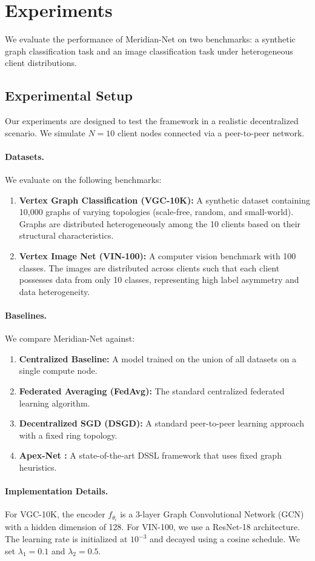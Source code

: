 \section{Experiments}
We evaluate the performance of Meridian-Net on two benchmarks: a synthetic graph classification task and an image classification task under heterogeneous client distributions.

\subsection{Experimental Setup}
Our experiments are designed to test the framework in a realistic decentralized scenario. We simulate $N=10$ client nodes connected via a peer-to-peer network.

\paragraph{Datasets.}
We evaluate on the following benchmarks:
\begin{enumerate}[label=\lbrack\arabic*\rbrack]
  \item \textbf{Vertex Graph Classification (VGC-10K):} A synthetic dataset containing 10,000 graphs of varying topologies (scale-free, random, and small-world). Graphs are distributed heterogeneously among the 10 clients based on their structural characteristics.
  \item \textbf{Vertex Image Net (VIN-100):} A computer vision benchmark with 100 classes. The images are distributed across clients such that each client possesses data from only 10 classes, representing high label asymmetry and data heterogeneity.
\end{enumerate}

\paragraph{Baselines.}
We compare Meridian-Net against:
\begin{enumerate}[label=\lbrack\arabic*\rbrack]
  \item \textbf{Centralized Baseline:} A model trained on the union of all datasets on a single compute node.
  \item \textbf{Federated Averaging (FedAvg):} The standard centralized federated learning algorithm.
  \item \textbf{Decentralized SGD (DSGD):} A standard peer-to-peer learning approach with a fixed ring topology.
  \item \textbf{Apex-Net \cite{nimbus2025large}:} A state-of-the-art DSSL framework that uses fixed graph heuristics.
\end{enumerate}

\paragraph{Implementation Details.}
For VGC-10K, the encoder $f_{\theta_i}$ is a 3-layer Graph Convolutional Network (GCN) with a hidden dimension of 128. For VIN-100, we use a ResNet-18 architecture. The learning rate is initialized at $10^{-3}$ and decayed using a cosine schedule. We set $\lambda_1 = 0.1$ and $\lambda_2 = 0.5$.
